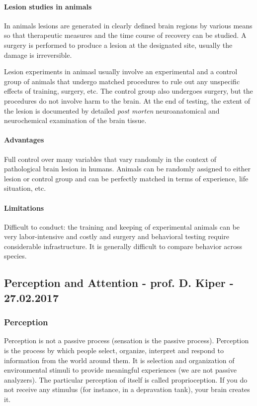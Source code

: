 \documentclass[12pt,article,oneside,a4paper]{memoir}
\begin{document}
\paragraph{Lesion studies in animals} In animals lesions are generated in clearly defined brain regions by various means so that therapeutic measures and the time course of recovery can be studied. A surgery is performed to produce a lesion at the designated site, usually the damage is irreversible.

Lesion experiments in animasl usually involve an experimental and a control group of animals that undergo matched procedures to rule out any unspecific effects of training, surgery, etc. The control group also undergoes surgery, but the procedures do not involve harm to the brain. At the end of testing, the extent of the lesion is documented by detailed \textit{post morten} neuroanatomical and neurochemical examination of the brain tissue.

\paragraph{Advantages} Full control over many variables that vary randomly in the context of pathological brain lesion in humans. Animals can be randomly assigned to either lesion or control group and can be perfectly matched in terms of experience, life situation, etc.

\paragraph{Limitations} Difficult to conduct: the training and keeping of experimental animals can be very labor-intensive and costly and surgery and behavioral testing require considerable infrastructure. It is generally difficult to compare behavior across species.



\subsection{Perception and Attention - prof. D. Kiper - 27.02.2017}

\subsubsection{Perception}
Perception is not a passive process (sensation is the passive process). Perception is the process by which people select, organize, interpret and respond to information from the world around them. It is selection and organization of environmental stimuli to provide meaningful experiences (we are not passive analyzers). The particular perception of itself is called proprioception. If you do not receive any stimulus (for instance, in a depravation tank), your brain creates it.
\end{document}
